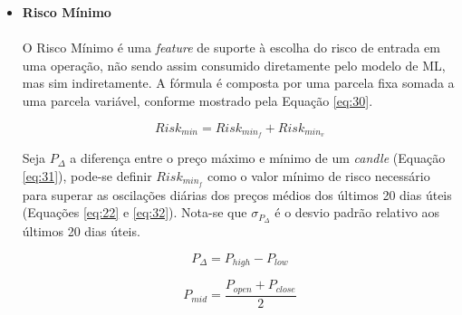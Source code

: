 \begin{itemize}

    \item \textbf{Risco Mínimo} \\ \\
    O Risco Mínimo é uma \textit{feature} de suporte à escolha do risco de entrada em uma operação, não sendo assim consumido diretamente pelo modelo de ML, mas sim indiretamente. A fórmula é composta por uma parcela fixa somada a uma parcela variável, conforme mostrado pela Equação \ref{eq:30}.

    \begin{equation} \label{eq:30}
        Risk_{min} = Risk_{min_f} + Risk_{min_v}
    \end{equation}

    Seja \begin{math} P_{\Delta} \end{math} a diferença entre o preço máximo e mínimo de um \textit{candle} (Equação \ref{eq:31}), pode-se definir \begin{math} Risk_{min_f} \end{math} como o valor mínimo de risco necessário para superar as oscilações diárias dos preços médios dos últimos 20 dias úteis (Equações \ref{eq:22} e \ref{eq:32}). Nota-se que \begin{math} \sigma_{P_{\Delta}} \end{math} é o desvio padrão relativo aos últimos 20 dias úteis.

    \begin{equation} \label{eq:31}
        P_{\Delta} = P_{high} - P_{low}
    \end{equation}

    \begin{equation} \label{eq:22}
        P_{mid} = \dfrac{P_{open} + P_{close}}{2}
    \end{equation}


\end{itemize}
